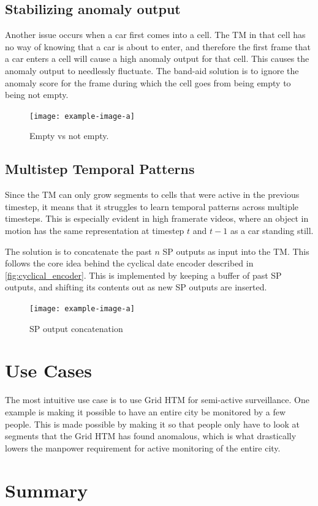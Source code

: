 \subsection{Stabilizing anomaly output}
Another issue occurs when a car first comes into a cell. The TM in that cell has no way of knowing that a car is about to enter, and therefore the first frame that a car enters a cell will cause a high anomaly output for that cell. This causes the anomaly output to needlessly fluctuate. The band-aid solution is to ignore the anomaly score for the frame during which the cell goes from being empty to being not empty.
\begin{figure}[H]
    \centering
    \texttt{[image: example-image-a]}
    \caption{Empty vs not empty.}
\end{figure}
\subsection{Multistep Temporal Patterns}
Since the TM can only grow segments to cells that were active in the previous timestep, it means that it struggles to learn temporal patterns across multiple timesteps. This is especially evident in high framerate videos, where an object in motion has the same representation at timestep $t$ and $t-1$ as a car standing still.
\par
The solution is to concatenate the past $n$ SP outputs as input into the TM. This follows the core idea behind the cyclical date encoder described in \ref{fig:cyclical_encoder}. This is implemented by keeping a buffer of past SP outputs, and shifting its contents out as new SP outputs are inserted.
\par

\begin{figure}[H]
    \centering
    \texttt{[image: example-image-a]}
    \caption{SP output concatenation}
\end{figure}
\section{Use Cases}
The most intuitive use case is to use Grid HTM for semi-active surveillance. One example is making it possible to have an entire city be monitored by a few people. This is made possible by making it so that people only have to look at segments that the Grid HTM has found anomalous, which is what drastically lowers the manpower requirement for active monitoring of the entire city.
\section{Summary}
